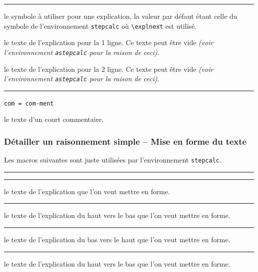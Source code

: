 \documentclass[12pt,a4paper]{article}
\theoremstyle{definition}
\newcommand\env[1]{\texttt{#1}}
\newcommand\macro[1]{\env{\textbackslash{}#1}}
\newcommand\separation{
    \medskip
    \hfill\rule{0.5\textwidth}{0.75pt}\hfill
    \medskip
}
\newcommand\mwhyprefix[2]{%
    \texttt{#1 = #1-#2}%
}
\begin{document}
\separation



\IDoption{} le symbole à utiliser pour une explication, la valeur par défaut étant celle du symbole de l'environnement \env{stepcalc} où \macro{explnext} est utilisé.

 le texte de l'explication pour la 1\iere{} ligne.
          Ce texte peut être vide \emph{(voir l'environnement \env{astepcalc} pour la raison de ceci)}.

 le texte de l'explication pour la 2\ieme{} ligne.
          Ce texte peut être vide \emph{(voir l'environnement \env{astepcalc} pour la raison de ceci)}.


\separation


  \hfill \mwhyprefix{com}{ment}



\IDarg{} le texte d'un court commentaire.




\subsubsection{Détailler un raisonnement simple -- Mise en forme du texte}

Les macros suivantes sont juste utilisées par l'environnement \env{stepcalc}.


\separation




\separation



\IDarg{} le texte de l'explication que l'on veut mettre en forme.


\separation



\IDarg{} le texte de l'explication du haut vers le bas que l'on veut mettre en forme.


\separation



\IDarg{} le texte de l'explication du bas vers le haut que l'on veut mettre en forme.


\separation



 le texte de l'explication du haut vers le bas que l'on veut mettre en forme.
\end{document}
